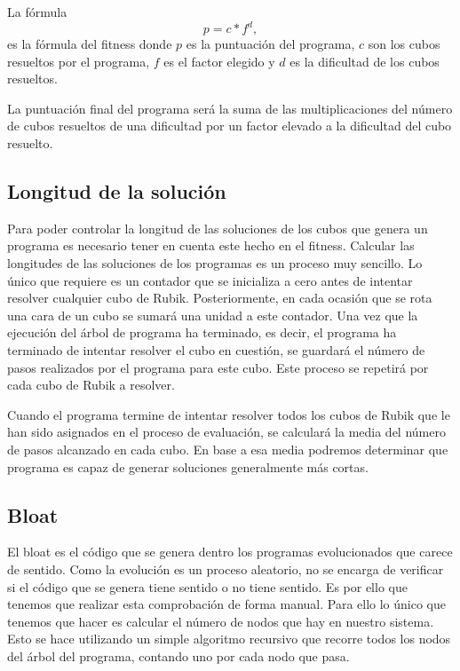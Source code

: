 La fórmula
\begin{equation}
   p = c*f ^ d,
\end{equation}
es la fórmula del fitness donde $p$ es la puntuación del programa, $c$ son los
cubos resueltos por el programa, $f$ es el factor elegido y $d$ es la
dificultad de los cubos resueltos.
 

La puntuación final del programa será la suma de las multiplicaciones del número
de cubos resueltos de una dificultad por un factor elevado a la dificultad del
cubo resuelto.


\subsection{Longitud de la solución}\label{subsec:long-solucion}


Para poder controlar la longitud de las soluciones de los cubos que genera un
programa es necesario tener en cuenta este hecho en el fitness. Calcular las
longitudes de las soluciones de los programas es un proceso muy sencillo. Lo
único que requiere es un contador que se inicializa a cero antes de intentar
resolver cualquier cubo de Rubik. Posteriormente, en cada ocasión que se rota una
cara de un cubo se sumará una unidad a este contador. Una vez que la ejecución
del árbol de programa ha terminado, es decir, el programa ha terminado de
intentar resolver el cubo en cuestión, se guardará el número de pasos realizados
por el programa para este cubo. Este proceso se repetirá por cada cubo de Rubik a
resolver.

Cuando el programa termine de intentar resolver todos los cubos de Rubik que le
han sido asignados en el proceso de evaluación, se calculará la media del número
de pasos alcanzado en cada cubo. En base a esa media podremos determinar que
programa es capaz de generar soluciones generalmente más cortas.

\subsection{Bloat}\label{subsec:bloat}

El bloat es el código que se genera dentro los programas evolucionados que carece
de sentido. Como la evolución es un proceso aleatorio, no se encarga de verificar
si el código que se genera tiene sentido o no tiene sentido. Es por ello que
tenemos que realizar esta comprobación de forma manual. Para ello lo único que
tenemos que hacer es calcular el número de nodos que hay en nuestro sistema. Esto
se hace utilizando un simple algoritmo recursivo que recorre todos los nodos del
árbol del programa, contando uno por cada nodo que pasa.

